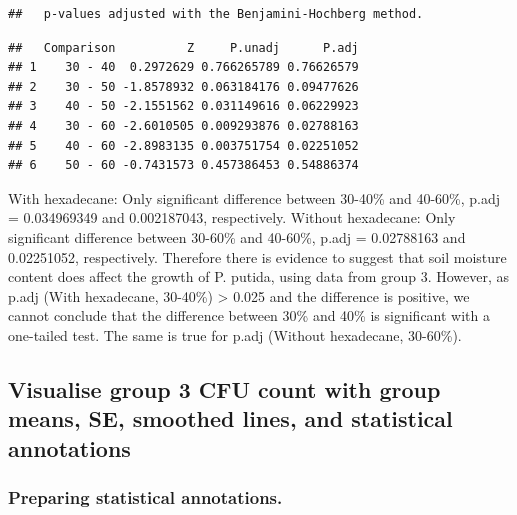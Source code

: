 \documentclass[
]{article}
\begin{document}
\begin{verbatim}
##   p-values adjusted with the Benjamini-Hochberg method.
\end{verbatim}

\begin{verbatim}
##   Comparison          Z     P.unadj      P.adj
## 1    30 - 40  0.2972629 0.766265789 0.76626579
## 2    30 - 50 -1.8578932 0.063184176 0.09477626
## 3    40 - 50 -2.1551562 0.031149616 0.06229923
## 4    30 - 60 -2.6010505 0.009293876 0.02788163
## 5    40 - 60 -2.8983135 0.003751754 0.02251052
## 6    50 - 60 -0.7431573 0.457386453 0.54886374
\end{verbatim}

With hexadecane: Only significant difference between 30-40\% and
40-60\%, p.adj = 0.034969349 and 0.002187043, respectively. Without
hexadecane: Only significant difference between 30-60\% and 40-60\%,
p.adj = 0.02788163 and 0.02251052, respectively. Therefore there is
evidence to suggest that soil moisture content does affect the growth of
P. putida, using data from group 3. However, as p.adj (With hexadecane,
30-40\%) \textgreater{} 0.025 and the difference is positive, we cannot
conclude that the difference between 30\% and 40\% is significant with a
one-tailed test. The same is true for p.adj (Without hexadecane,
30-60\%).

\subsection{Visualise group 3 CFU count with group means, SE, smoothed
lines, and statistical
annotations}\label{visualise-group-3-cfu-count-with-group-means-se-smoothed-lines-and-statistical-annotations}

\subsubsection{Preparing statistical
annotations.}\label{preparing-statistical-annotations.}
\end{document}
